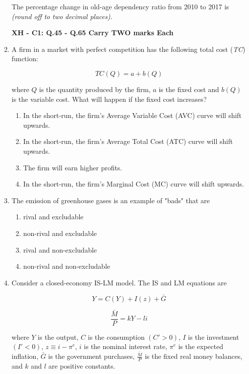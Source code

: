 \documentclass[journal,13pt,onecolumn]{exam}
\theoremstyle{remark}
\begin{document}
\begin{enumerate}[label=Q.\arabic*]
\bigskip

The percentage change in old-age dependency ratio from 2010 to 2017 is \underline{\hspace{1.5cm}} \textit{(round off to two decimal places)}.

\newpage
\textbf{XH - C1: Q.45 - Q.65 Carry TWO marks Each}\\

\item A firm in a market with perfect competition has the following total cost (\textit{TC}) function:

\[
TC(Q) = a + b(Q)
\]

where \(Q\) is the quantity produced by the firm, \(a\) is the fixed cost and \(b(Q)\) is the variable cost. What will happen if the fixed cost increases?

\begin{enumerate}
  \item In the short-run, the firm's Average Variable Cost (AVC) curve will shift upwards.
  \item In the short-run, the firm's Average Total Cost (ATC) curve will shift upwards.
  \item The firm will earn higher profits.
  \item In the short-run, the firm's Marginal Cost (MC) curve will shift upwards.
\end{enumerate}

\vspace{1em}

\item The emission of greenhouse gases is an example of "bads" that are

\begin{enumerate}
  \item rival and excludable
  \item non-rival and excludable
  \item rival and non-excludable
  \item non-rival and non-excludable
  
\end{enumerate}

\item Consider a closed-economy IS-LM model. The IS and LM equations are

\[
Y = C(Y) + I(z) + \bar{G}
\]

\[
\frac{\bar{M}}{P} = k Y - l i
\]

where \(Y\) is the output, \(C\) is the consumption \((C' > 0)\), \(I\) is the investment \((I' < 0)\), \(z \equiv i - \pi^{e}\), \(i\) is the nominal interest rate, \(\pi^{e}\) is the expected inflation, \(\bar{G}\) is the government purchases, \(\frac{\bar{M}}{P}\) is the fixed real money balances, and \(k\) and \(l\) are positive constants.


\end{enumerate}
\end{document}
